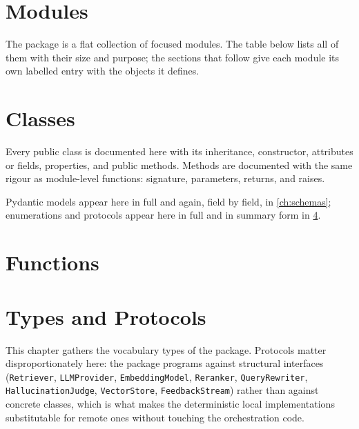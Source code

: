 

\chapter{Modules}
\label{ch:modules}

The package is a flat collection of focused modules. The table below lists all
of them with their size and purpose; the sections that follow give each module
its own labelled entry with the objects it defines.



\chapter{Classes}
\label{ch:classes}

Every public class is documented here with its inheritance, constructor,
attributes or fields, properties, and public methods. Methods are documented
with the same rigour as module-level functions: signature, parameters,
returns, and raises.

Pydantic models appear here in full and again, field by field, in
\cref{ch:schemas}; enumerations and protocols appear here in full and in
summary form in \cref{ch:types}.



\chapter{Functions}
\label{ch:functions}



\chapter{Types and Protocols}
\label{ch:types}

This chapter gathers the vocabulary types of the package. Protocols matter
disproportionately here: the package programs against structural interfaces
(\texttt{Retriever}, \texttt{LLMProvider}, \texttt{EmbeddingModel},
\texttt{Reranker}, \texttt{QueryRewriter}, \texttt{HallucinationJudge},
\texttt{VectorStore}, \texttt{FeedbackStream}) rather than against concrete
classes, which is what makes the deterministic local implementations
substitutable for remote ones without touching the orchestration code.



